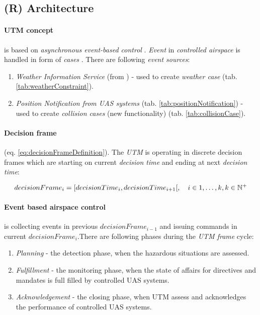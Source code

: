 \subsection{(R) Architecture}
\paragraph{UTM concept} is based on \emph{asynchronous event-based control} \cite{zimmer2011rule}. \emph{Event} in \emph{controlled airspace} is handled in form of \emph{cases} \cite{prevot2016uas}. There are following \emph{event sources}:

\begin{enumerate}
    \item \emph{Weather Information Service} (from \cite{zimmer2014selective}) - used to create \emph{weather case} (tab. \ref{tab:weatherConstraint}).
    
    \item \emph{Position Notification from UAS systems} (tab. \ref{tab:positionNotification}) - used to create \emph{collision cases} (new functionality) (tab. \ref{tab:collisionCase}).
\end{enumerate}


\paragraph{Decision frame} (eq. \ref{eq:decisionFrameDefinition}). The \emph{UTM} is operating in discrete decision frames which are starting on current \emph{decision time} and ending at  next \emph{decision  time}:

\begin{equation}\label{eq:decisionFrameDefinition}
    decision Frame_i = [decision Time_i, decision Time_{i+1}[,\quad i \in {1,\dots,k}, k \in \mathbb{N}^+
\end{equation}

\paragraph{Event based airspace control} is collecting  events in  previous $decisionFrame_{i-1}$ and issuing commands in current $decisionFrame_i$.There are following phases during the \emph{UTM frame} cycle:
\begin{enumerate}
    \item \emph{Planning} - the detection phase, when the hazardous situations are assessed.
    
    \item \emph{Fulfillment} - the monitoring phase, when the state of affairs for directives and mandates is full filled by controlled UAS systems. 
    
    \item \emph{Acknowledgement} - the closing phase, when UTM assess and acknowledges the performance of controlled UAS systems.
\end{enumerate}


